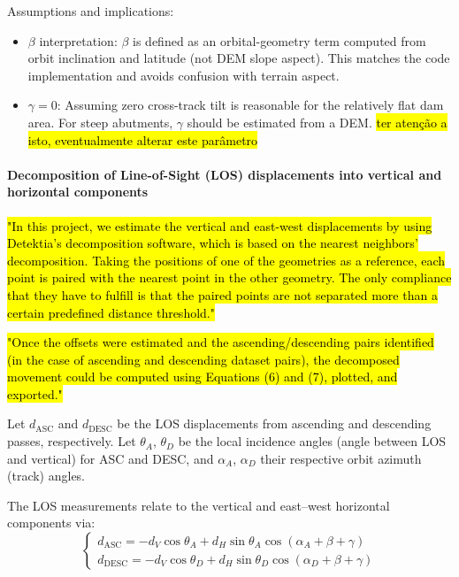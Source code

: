 \documentclass[11pt,a4paper]{article}
\begin{document}
Assumptions and implications:

\begin{itemize}
  \item $\beta$ interpretation: $\beta$ is defined as an orbital-geometry term computed from orbit inclination and latitude (not DEM slope aspect). This matches the code implementation and avoids confusion with terrain aspect.
  \item $\gamma = 0$: Assuming zero cross-track tilt is reasonable for the relatively flat dam area. For steep abutments, $\gamma$ should be estimated from a DEM. \hl{\mbox ter atenção a isto, eventualmente alterar este parâmetro}
\end{itemize}

\paragraph{Decomposition of Line-of-Sight (LOS) displacements into vertical and horizontal components}

\hl{\mbox{\parencite{ruiz-armenteros2023}} "In this project, we estimate the vertical and east-west displacements by using Detektia's decomposition software, which is based on the nearest neighbors’ decomposition. Taking the positions of one of the geometries as a reference, each point is paired with the nearest point in the other geometry. The only compliance that they have to fulfill is that the paired points are not separated more than a certain predefined distance threshold."}

\hl{\mbox{\parencite{marchamalo-sacristan2023}} "Once the offsets were estimated and the ascending/descending pairs identified (in the case of ascending and descending dataset pairs), the decomposed movement could be computed using Equations (6) and (7), plotted, and exported."}


Let $d_{\text{ASC}}$ and $d_{\text{DESC}}$ be the LOS displacements from ascending and descending passes, respectively.  
Let $\theta_A$, $\theta_D$ be the local incidence angles (angle between LOS and vertical) for ASC and DESC, and $\alpha_A$, $\alpha_D$ their respective orbit azimuth (track) angles.

\noindent The LOS measurements relate to the vertical and east–west horizontal components via:
\begin{equation}
\begin{cases}
d_{\text{ASC}} = -d_V \cos\theta_A + d_H \sin\theta_A \cos(\alpha_A + \beta + \gamma) \\
d_{\text{DESC}} = -d_V \cos\theta_D + d_H \sin\theta_D \cos(\alpha_D + \beta + \gamma)
\end{cases}
\end{equation}
\end{document}
